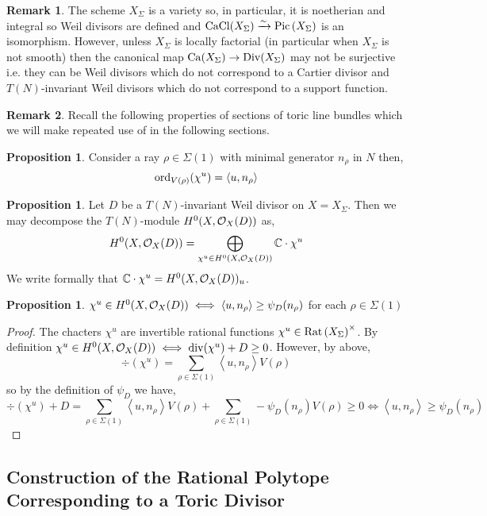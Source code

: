 \documentclass[12pt]{extarticle}
\newcommand{\C}{\mathbb{C}}
\theoremstyle{definition}
\newtheorem{proposition}[theorem]{Proposition}
\newtheorem{remark}{Remark}
\newcommand{\inner}[2]{\left< #1, #2 \right>}
\begin{document}
\begin{remark}
The scheme $X_\Sigma$ is a variety so, in particular, it is noetherian and integral so Weil divisors are defined and $\mathrm{CaCl}{(X_\Sigma)} \xrightarrow{\sim} \mathrm{Pic}\left( X_\Sigma \right)$ is an isomorphism. However, unless $X_\Sigma$ is locally factorial (in particular when $X_\Sigma$ is not smooth) then the canonical map $\mathrm{Ca}{(X_\Sigma)} \to \mathrm{Div}{(X_\Sigma)}$ may not be surjective i.e. they can be Weil divisors which do not correspond to a Cartier divisor and $T(N)$-invariant Weil divisors which do not correspond to a support function. 
\end{remark}

\begin{remark}
Recall the following properties of sections of toric line bundles which we will make repeated use of in the following sections.
\end{remark}

\begin{proposition}
Consider a ray $\rho \in \Sigma(1)$ with minimal generator $n_\rho$ in $N$ then,
\[ \ord_{V(\rho)}(\chi^u) = \inner{u}{n_\rho} \]
\end{proposition}


\begin{proposition}
Let $D$ be a $T(N)$-invariant Weil divisor on $X = X_\Sigma$. Then we may decompose the $T(N)$-module $H^0(X, \mathcal{O}_{X}(D))$ as,
\[ H^0(X, \struct{X}(D)) = \bigoplus_{\chi^u \in H^0(X, \struct{X}(D))} \C \cdot \chi^u \]
We write formally that $\C \cdot \chi^u = H^0(X, \struct{X}(D))_u$. 
\end{proposition}

\begin{proposition}
$\chi^u \in H^0(X, \struct{X}(D)) \iff \inner{u}{n_\rho} \ge \psi_D(n_\rho)$ for each $\rho \in \Sigma(1)$
\end{proposition}

\begin{proof}
The chacters $\chi^u$ are invertible rational functions $\chi^u \in \mathrm{Rat} \left( X_\Sigma \right)^\times$. By definition $\chi^u \in H^0(X, \mathcal{O}_{X}(D)) \iff \mathrm{div}(\chi^u) + D \ge 0$. However, by above,
\[ \div{(\chi^u)} = \sum_{\rho \in \Sigma(1)} \inner{u}{n_\rho} V(\rho) \]
so by the definition of $\psi_D$ we have,
\[ \div(\chi^u) + D = \sum_{\rho \in \Sigma(1)} \inner{u}{n_\rho} V(\rho) + \sum_{\rho \in \Sigma(1)} -\psi_D(n_\rho) V(\rho) \ge 0 \iff \inner{u}{n_\rho} \ge \psi_D(n_\rho) \]
\end{proof}


\subsection{Construction of the Rational Polytope Corresponding to a Toric Divisor}
\end{document}
